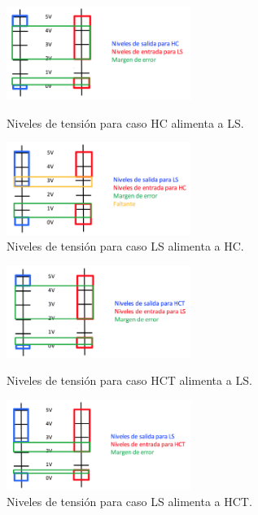 \begin{figure}[H]
\begin{center}
  \begin{minipage}[b]{0.4\textwidth}
  	\begin{center}
  		\includegraphics[width=6cm]{ejercicio2/HC-LS}
    \caption{Niveles de tensi\'on para caso HC alimenta a LS.} %
  	\end{center}
  \end{minipage}
  \begin{minipage}[b]{0.4\textwidth}
    \begin{center}
  		\includegraphics[width=6cm]{ejercicio2/LS-HC}
    \caption{Niveles de tensi\'on para caso LS alimenta a HC.} %
	\end{center}
 \end{minipage}
\end{center}
\end{figure}


\begin{figure}[H]
\begin{center}
  \begin{minipage}[b]{0.4\textwidth}
  	\begin{center}
  		\includegraphics[width=6cm]{ejercicio2/HCT-LS}
    \caption{Niveles de tensi\'on para caso HCT alimenta a LS.} %
  	\end{center}
  \end{minipage}
  \begin{minipage}[b]{0.4\textwidth}
    \begin{center}
  		\includegraphics[width=6cm]{ejercicio2/LS-HCT}
    \caption{Niveles de tensi\'on para caso LS alimenta a HCT.} %
	\end{center}
 \end{minipage}
\end{center}
\end{figure}


